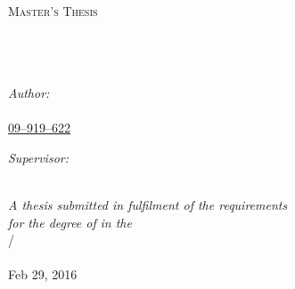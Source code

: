 \documentclass[11pt, a4paper, oneside]{Thesis} %
\begin{document}
\begin{titlepage}
\begin{center}

\textsc{\LARGE \univname}\\[1.5cm] %
\textsc{\Large Master's Thesis}\\[0.5cm] %

\HRule \\[0.4cm] %
{\huge \bfseries \ttitle}\\[0.4cm] %
\HRule \\[1.5cm] %
 
\begin{minipage}{0.45\textwidth}
\begin{flushleft} \large
\emph{Author:}\\
\href{http://www.sleepy-robots.org}{\authornames \\ 09--919--622} %
\end{flushleft}
\end{minipage}
\begin{minipage}{0.45\textwidth}
\begin{flushright} \large
\emph{Supervisor:} \\
\href{http://stoop.ini.uzh.ch}{\supname\linebreak} %
\end{flushright}
\end{minipage}\\[3cm]
 
\large \textit{A thesis submitted in fulfilment of the requirements\\ for the degree of \degreename} %
\textit{in the}\\[0.4cm]
\groupname/\facname\\\deptname\\[2cm] %
 
{\large Feb 29, 2016}\\[2.5cm] %
 
\vfill
\end{center}

\end{titlepage}
\end{document}
